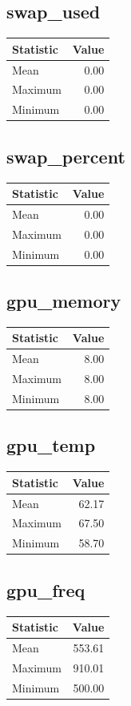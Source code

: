 \documentclass[11pt]{article}
\begin{document}
\subsection{swap_used}
\begin{tabular}{lr}
\toprule
Statistic & Value \\
\midrule
Mean & 0.00 \\
Maximum & 0.00 \\
Minimum & 0.00 \\
\bottomrule
\end{tabular}


\subsection{swap_percent}
\begin{tabular}{lr}
\toprule
Statistic & Value \\
\midrule
Mean & 0.00 \\
Maximum & 0.00 \\
Minimum & 0.00 \\
\bottomrule
\end{tabular}


\subsection{gpu_memory}
\begin{tabular}{lr}
\toprule
Statistic & Value \\
\midrule
Mean & 8.00 \\
Maximum & 8.00 \\
Minimum & 8.00 \\
\bottomrule
\end{tabular}


\subsection{gpu_temp}
\begin{tabular}{lr}
\toprule
Statistic & Value \\
\midrule
Mean & 62.17 \\
Maximum & 67.50 \\
Minimum & 58.70 \\
\bottomrule
\end{tabular}


\subsection{gpu_freq}
\begin{tabular}{lr}
\toprule
Statistic & Value \\
\midrule
Mean & 553.61 \\
Maximum & 910.01 \\
Minimum & 500.00 \\
\bottomrule
\end{tabular}
\end{document}
